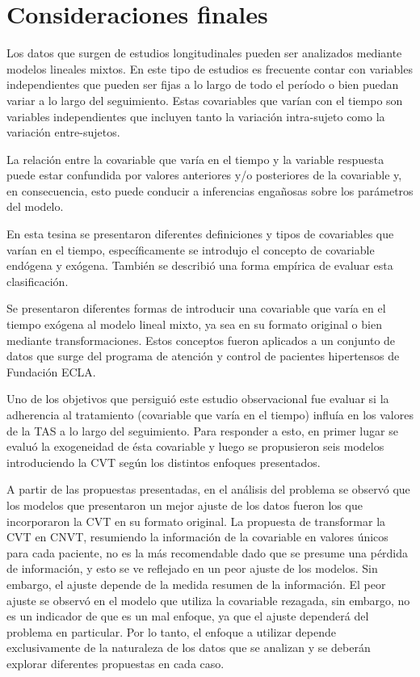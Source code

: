 \documentclass[spanish]{article}
\numberwithin{figure}{subsection}
\numberwithin{equation}{subsection}
\numberwithin{table}{subsection}
\begin{document}
\newpage

\section{Consideraciones finales}

Los datos que surgen de estudios longitudinales pueden ser analizados mediante
modelos lineales mixtos. En este tipo de estudios es frecuente contar con
variables independientes que pueden ser fijas a lo largo de todo el período o
bien puedan variar a lo largo del seguimiento. Estas covariables que varían con
el tiempo son variables independientes que incluyen tanto la variación
intra-sujeto como la variación entre-sujetos.

La relación entre la covariable que varía en el tiempo y la variable respuesta
puede estar confundida por valores anteriores y/o posteriores de la covariable
y, en consecuencia, esto puede conducir a inferencias engañosas sobre los
parámetros del modelo.

En esta tesina se presentaron diferentes definiciones y tipos de covariables que
varían en el tiempo, específicamente se introdujo el concepto de covariable
endógena y exógena. También se describió una forma empírica de evaluar esta
clasificación.

Se presentaron diferentes formas de introducir una covariable que varía en el
tiempo exógena al modelo lineal mixto, ya sea en su formato original o bien
mediante transformaciones. Estos conceptos fueron aplicados a un conjunto de
datos que surge del programa de atención y control de pacientes hipertensos de
Fundación ECLA.

Uno de los objetivos que persiguió este estudio observacional fue evaluar si la
adherencia al tratamiento (covariable que varía en el tiempo) influía en los
valores de la TAS a lo largo del seguimiento. Para responder a esto, en primer
lugar se evaluó la exogeneidad de ésta covariable y luego se propusieron seis
modelos introduciendo la CVT según los distintos enfoques presentados.

A partir de las propuestas presentadas, en el análisis del problema se observó
que los modelos que presentaron un mejor ajuste de los datos fueron los que
incorporaron la CVT en su formato original. La propuesta de transformar la CVT
en CNVT, resumiendo la información de la covariable en valores únicos para cada
paciente, no es la más recomendable dado que se presume una pérdida de
información, y esto se ve reflejado en un peor ajuste de los modelos. Sin
embargo, el ajuste depende de la medida resumen de la información. El peor
ajuste se observó en el modelo que utiliza la covariable rezagada, sin embargo,
no es un indicador de que es un mal enfoque, ya que el ajuste dependerá del
problema en particular. Por lo tanto, el enfoque a utilizar depende
exclusivamente de la naturaleza de los datos que se analizan y se deberán
explorar diferentes propuestas en cada caso.
\end{document}
